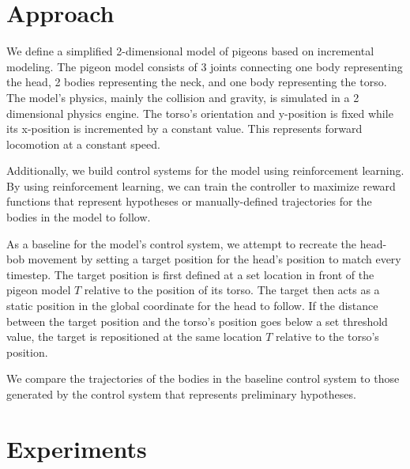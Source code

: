 \chapter{Approach}
  We define a simplified 2-dimensional model of pigeons based on incremental modeling. The pigeon model consists of 3 joints connecting one body representing the head, 2 bodies representing the neck, and one body representing the torso. The model's physics, mainly the collision and gravity, is simulated in a 2 dimensional physics engine. The torso's orientation and y-position is fixed while its x-position is incremented by a constant value. This represents forward locomotion at a constant speed.

  Additionally, we build control systems for the model using reinforcement learning. By using reinforcement learning, we can train the controller to maximize reward functions that represent hypotheses or manually-defined trajectories for the bodies in the model to follow.

  As a baseline for the model's control system, we attempt to recreate the head-bob movement by setting a target position for the head's position to match every timestep. The target position is first defined at a set location in front of the pigeon model $T$ relative to the position of its torso. The target then acts as a static position in the global coordinate for the head to follow. If the distance between the target position and the torso's position goes below a set threshold value, the target is repositioned at the same location $T$ relative to the torso's position.

  We compare the trajectories of the bodies in the baseline control system to those generated by the control system that represents preliminary hypotheses.




\chapter{Experiments}
